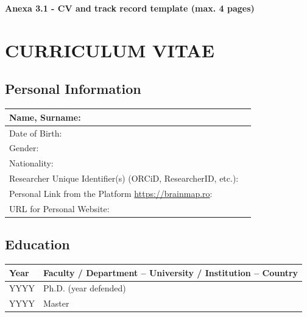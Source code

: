 \documentclass[draftproposal,pncdic]{pncdi-pd}
\begin{document}
\begin{pncdiexplanation}
\textbf{Anexa 3.1 - CV and track record template (max. 4 pages)}
\end{pncdiexplanation}

\section*{CURRICULUM VITAE}

\subsection*{Personal Information}

{
\noindent \begin{tabular}{|m{}|m{}|} \hline
\cellcolor{PNCDITableLightGray}
Name, Surname: &
\\\hline

\cellcolor{PNCDITableLightGray}
Date of Birth: &
\\\hline

\cellcolor{PNCDITableLightGray}
Gender: &
\\\hline

\cellcolor{PNCDITableLightGray}
Nationality: &
\\\hline

\cellcolor{PNCDITableLightGray}
Researcher Unique Identifier(s) (ORCiD, ResearcherID, etc.): &
\\\hline

\cellcolor{PNCDITableLightGray}
Personal Link from the Platform
\url{https://brainmap.ro}: &
\\\hline

\cellcolor{PNCDITableLightGray}
URL for Personal Website: &
\\\hline
\end{tabular}
}

\subsection*{Education}

{
\noindent \begin{tabular}{|m{}|m{}|} \hline
\rowcolor{PNCDITableLightGray}
Year & Faculty / Department -- University / Institution -- Country
\\\hline

YYYY & Ph.D. (year defended)
\\\hline

YYYY & Master
\\\hline
\end{tabular}
}
\end{document}
